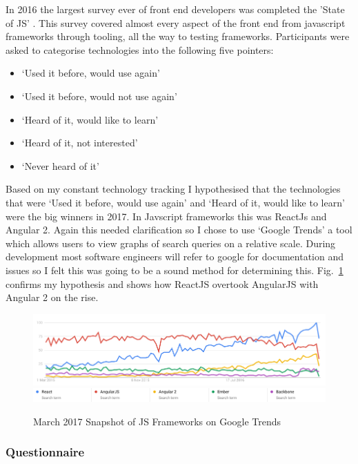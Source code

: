 In 2016 the largest survey ever of front end developers was completed the
'State of JS' \citep{StateOfJs}. This survey covered almost every aspect of the front end
from javascript frameworks through tooling, all the way to testing frameworks.
Participants were asked to categorise technologies into the following five
pointers:
 \begin{itemize}
  \item `Used it before, would use again'
  \item `Used it before, would not use again'
  \item `Heard of it, would like to learn'
  \item `Heard of it, not interested'
  \item `Never heard of it'
 \end{itemize}

Based on my constant technology tracking I hypothesised that the technologies
that were `Used it before, would use again' and `Heard of it, would like to
learn' were the big winners in 2017. In Javscript frameworks this was ReactJs
and Angular 2. Again this needed clarification so I chose to use `Google
Trends' \citep{GoogleTrends} a tool which allows users to view graphs of
search queries on a
relative scale. During development most software engineers will
refer to google for documentation and issues so I felt this was going to be a
sound method for determining this. Fig.~\ref{fig:js_compare} confirms my
hypothesis and shows how ReactJS overtook AngularJS with Angular 2 on the rise.

\begin{figure}[H]
\centering
\centering
\includegraphics[width=\textwidth]{figures/js_compare}
\includegraphics[width=\textwidth]{figures/js_compare_key}
\captionsetup{justification=centering}
\caption{March 2017 Snapshot of JS Frameworks on Google Trends
\label{fig:js_compare}}
\end{figure}

\subsubsection{Questionnaire}

